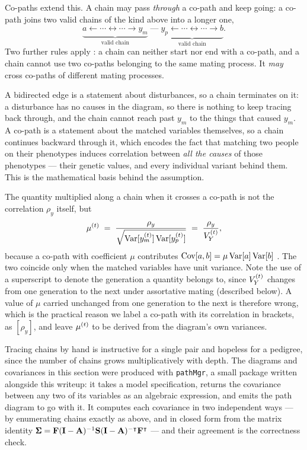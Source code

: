\documentclass[12pt]{article}
\begin{document}
Co-paths extend this.
A chain may pass \emph{through} a co-path and keep going: a co-path joins two valid chains of the kind above into a longer one,
$$
    \underbrace{a \leftarrow \cdots \leftrightarrow \cdots \rightarrow y_m}_{\text{valid chain}}
    \;\text{---}\;
    \underbrace{y_p \leftarrow \cdots \leftrightarrow \cdots \rightarrow b}_{\text{valid chain}} .
$$
Two further rules apply \citep{Sunde2025NatComm}: a chain can neither start nor end with a co-path, and a chain cannot use two co-paths belonging to the same mating process.
It \emph{may} cross co-paths of different mating processes.

A bidirected edge is a statement about disturbances, so a chain terminates on it: a disturbance has no causes in the diagram, so there is nothing to keep tracing back through, and the chain cannot reach past $y_m$ to the things that caused $y_m$.
A co-path is a statement about the matched variables themselves, so a chain continues backward through it, which encodes the fact that matching two people on their phenotypes induces correlation between \emph{all the causes} of those phenotypes --- their genetic values, and every individual variant behind them.
This is the mathematical basis behind the  assumption.

The quantity multiplied along a chain when it crosses a co-path is not the correlation $\rho_y$ itself, but
\begin{equation}\label{eq:copath-mu}
    \mu^{(t)} \;=\; \frac{\rho_y}{\sqrt{\mathrm{Var}[y^{(t)}_m]\,\mathrm{Var}[y^{(t)}_p]}} \;=\; \frac{\rho_y}{V_Y^{(t)}} ,
\end{equation}
because a co-path with coefficient $\mu$ contributes $\mathrm{Cov}[a,b] = \mu\,\mathrm{Var}[a]\,\mathrm{Var}[b]$ \citep{Sunde2025NatComm}.
The two coincide only when the matched variables have unit variance.
Note the use of a superscript to denote the generation a quantity belongs to, since $V_Y^{(t)}$ changes from one generation to the next under assortative mating (described below).
A value of $\mu$ carried unchanged from one generation to the next is therefore wrong, which is the practical reason we label a co-path with its correlation in brackets, as $[\rho_y]$, and leave $\mu^{(t)}$ to be derived from the diagram's own variances.

Tracing chains by hand is instructive for a single pair and hopeless for a pedigree, since the number of chains grows multiplicatively with depth.
The diagrams and covariances in this section were produced with \texttt{pathMgr}, a small package written alongside this writeup: it takes a model specification, returns the covariance between any two of its variables as an algebraic expression, and emits the path diagram to go with it.
It computes each covariance in two independent ways --- by enumerating chains exactly as above, and in closed form from the matrix identity $\pmb{\Sigma} = \mathbf{F}(\mathbf{I}-\mathbf{A})^{-1}\mathbf{S}(\mathbf{I}-\mathbf{A})^{-\intercal}\mathbf{F}^{\intercal}$ --- and their agreement is the correctness check.
\end{document}
